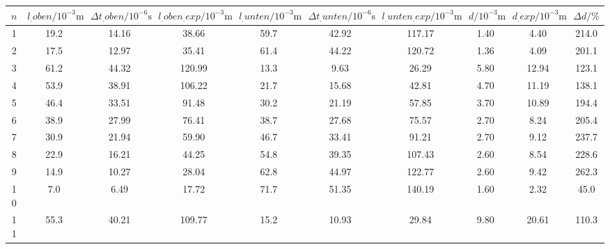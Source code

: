 \label{tab:tabAScan2}
	\begin{tabular}{S[table-format=1.0]S[table-format=2.1]S[table-format=2.2]S[table-format=2.2]S[table-format=2.1]S[table-format=2.2]S[table-format=2.2]S[table-format=2.2]S[table-format=2.2]S[table-format=2.1]}
		\toprule
		{$n$} & {$l_.{oben}/10^{-3}\si{\metre}$} & {$\Delta t_.{oben}/10^{-6}\si{\second}$} & {$l_.{oben_.{exp}}/10^{-3}\si{\metre}$} & {$l_.{unten}/10^{-3}\si{\metre}$} & {$\Delta t_.{unten}/10^{-6}\si{\second}$} & {$l_.{unten_.{exp}}/10^{-3}\si{\metre}$} & {$d/10^{-3}\si{\metre}$} & {$d_.{exp}/10^{-3}\si{\metre}$} & {$\Delta d/\%$} \\
		 & 19.2 & 14.16 & 38.66 & 59.7 & 42.92 & 117.17 & 1.40 & 4.40 & 214.0 \\
		2 & 17.5 & 12.97 & 35.41 & 61.4 & 44.22 & 120.72 & 1.36 & 4.09 & 201.1 \\
		3 & 61.2 & 44.32 & 120.99 & 13.3 & 9.63 & 26.29 & 5.80 & 12.94 & 123.1 \\
		4 & 53.9 & 38.91 & 106.22 & 21.7 & 15.68 & 42.81 & 4.70 & 11.19 & 138.1 \\
		5 & 46.4 & 33.51 & 91.48 & 30.2 & 21.19 & 57.85 & 3.70 & 10.89 & 194.4 \\
		6 & 38.9 & 27.99 & 76.41 & 38.7 & 27.68 & 75.57 & 2.70 & 8.24 & 205.4 \\
		7 & 30.9 & 21.94 & 59.90 & 46.7 & 33.41 & 91.21 & 2.70 & 9.12 & 237.7 \\
		8 & 22.9 & 16.21 & 44.25 & 54.8 & 39.35 & 107.43 & 2.60 & 8.54 & 228.6 \\
		9 & 14.9 & 10.27 & 28.04 & 62.8 & 44.97 & 122.77 & 2.60 & 9.42 & 262.3 \\
		10 & 7.0 & 6.49 & 17.72 & 71.7 & 51.35 & 140.19 & 1.60 & 2.32 & 45.0 \\
		11 & 55.3 & 40.21 & 109.77 & 15.2 & 10.93 & 29.84 & 9.80 & 20.61 & 110.3 \\
		\bottomrule
	\end{tabular}
